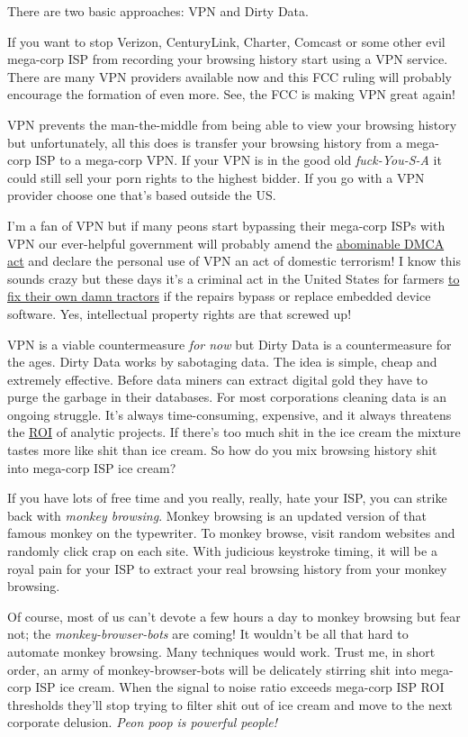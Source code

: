 There are two basic approaches: VPN and Dirty Data.

If you want to stop Verizon, CenturyLink, Charter, Comcast or some other
evil mega-corp ISP from recording your browsing history start using a
VPN service. There are many VPN providers available now and this FCC
ruling will probably encourage the formation of even more. See, the FCC
is making VPN great again!

VPN prevents the man-the-middle from being able to view your browsing
history but unfortunately, all this does is transfer your browsing
history from a mega-corp ISP to a mega-corp VPN. If your VPN is in the
good old \emph{fuck-You-S-A} it could still sell your porn rights to the
highest bidder. If you go with a VPN provider choose one that's based
outside the US.

I'm a fan of VPN but if many peons start bypassing their mega-corp ISPs
with VPN our ever-helpful government will probably amend the
\href{https://en.wikipedia.org/wiki/Digital_Millennium_Copyright_Act}{abominable
DMCA act} and declare the personal use of VPN an act of domestic
terrorism! I know this sounds crazy but these days it's a criminal act
in the United States for farmers
\href{http://modernfarmer.com/2016/07/right-to-repair/}{to fix their own
damn tractors} if the repairs bypass or replace embedded device
software. Yes, intellectual property rights are that screwed up!

VPN is a viable countermeasure \emph{for now} but Dirty Data is a
countermeasure for the ages. Dirty Data works by sabotaging data. The
idea is simple, cheap and extremely effective. Before data miners can
extract digital gold they have to purge the garbage in their databases.
For most corporations cleaning data is an ongoing struggle. It's always
time-consuming, expensive, and it always threatens the
\href{http://www.investopedia.com/terms/r/returnoninvestment.asp}{ROI}
of analytic projects. If there's too much shit in the ice cream the
mixture tastes more like shit than ice cream. So how do you mix browsing
history shit into mega-corp ISP ice cream?

If you have lots of free time and you really, really, hate your ISP, you
can strike back with \emph{monkey browsing}. Monkey browsing is an
updated version of that famous monkey on the typewriter. To monkey
browse, visit random websites and randomly click crap on each site. With
judicious keystroke timing, it will be a royal pain for your ISP to
extract your real browsing history from your monkey browsing.

Of course, most of us can't devote a few hours a day to monkey browsing
but fear not; the \emph{monkey-browser-bots} are coming! It wouldn't be
all that hard to automate monkey browsing. Many techniques would work.
Trust me, in short order, an army of monkey-browser-bots will be
delicately stirring shit into mega-corp ISP ice cream. When the signal
to noise ratio exceeds mega-corp ISP ROI thresholds they'll stop trying
to filter shit out of ice cream and move to the next corporate delusion.
\emph{Peon poop is powerful people!}



%